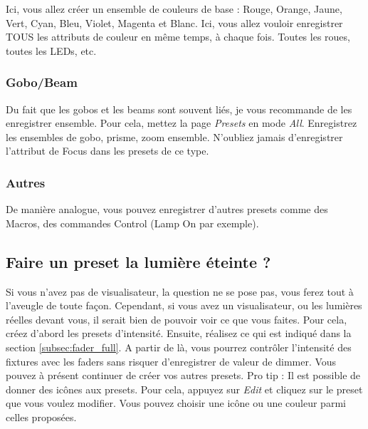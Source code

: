 Ici, vous allez créer un ensemble de couleurs de base : Rouge, Orange, Jaune, Vert, Cyan, Bleu, Violet, Magenta et Blanc.
\newline
Ici, vous allez vouloir enregistrer TOUS les attributs de couleur en même temps, à chaque fois. Toutes les roues, toutes les LEDs, etc.

\subsubsection{Gobo/Beam}
\label{subsubsec:presets_gobo_beam}

Du fait que les gobos et les beams sont souvent liés, je vous recommande de les enregistrer ensemble.
\newline
\newline
Pour cela, mettez la page \textit{Presets} en mode \textit{All}.
Enregistrez les ensembles de gobo, prisme, zoom ensemble. N'oubliez jamais d'enregistrer l'attribut de Focus dans les presets de ce type.

\subsubsection{Autres}
\label{subsubsec:presets_autres}

De manière analogue, vous pouvez enregistrer d'autres presets comme des Macros, des commandes Control (Lamp On par exemple).

\subsection{Faire un preset la lumière éteinte ?}
\label{subsec:presets_lumiere_eteinte}

Si vous n'avez pas de visualisateur, la question ne se pose pas, vous ferez tout à l'aveugle de toute façon.
\newline
Cependant, si vous avez un visualisateur, ou les lumières réelles devant vous, il serait bien de pouvoir voir ce que vous faites.
Pour cela, créez d'abord les presets d'intensité. Ensuite, réalisez ce qui est indiqué dans la section \ref{subsec:fader_full}.
A partir de là, vous pourrez contrôler l'intensité des fixtures avec les faders sans risquer d'enregistrer de valeur de dimmer.
Vous pouvez à présent continuer de créer vos autres presets.
\newline
\newline
Pro tip : Il est possible de donner des icônes aux presets. Pour cela, appuyez sur \textit{Edit} et cliquez sur le preset que vous voulez modifier. Vous pouvez choisir une icône ou une couleur parmi celles proposées.